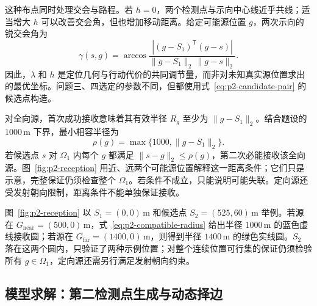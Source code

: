 这种布点同时处理交会与路程。若 \(h=0\)，两个检测点与示向中心线近乎共线；适当增大 \(h\) 可以改善交会角，但也增加移动距离。给定可能源位置 \(g\)，两次示向的锐交会角为
\begin{equation}
  \gamma(s,g)=\arccos\frac{\left|(g-S_1)^{\mathsf T}(g-s)\right|}
  {\|g-S_1\|_2\,\|g-s\|_2}.
  \label{eq:p2-crossing-angle}
\end{equation}
因此，\(\lambda\) 和 \(h\) 是定位几何与行动代价的共同调节量，而非对未知真实源位置求出的最优坐标。问题三、四选定的参数不同，但都使用式~\eqref{eq:p2-candidate-pair} 的候选点构造。

对全向源，首次成功接收意味着其有效半径 \(R_g\) 至少为 \(\|g-S_1\|_2\)。结合题设的 \(1000\,\mathrm{m}\) 下界，最小相容半径为
\begin{equation}
  \rho(g)=\max\{1000,\|g-S_1\|_2\}.
  \label{eq:p2-compatible-radius}
\end{equation}
若候选点 \(s\) 对 \(\Omega_1\) 内每个 \(g\) 都满足 \(\|s-g\|_2\le\rho(g)\)，第二次必能接收该全向源。图~\ref{fig:p2-reception} 用近、远两个可能源位置解释这一距离条件；它们只是示意，完整保证仍须检查整个 \(\Omega_1\)。若条件不成立，只能说明可能失联。定向源还受发射朝向限制，距离条件不能单独保证接收。


图~\ref{fig:p2-reception} 以 \(S_1=(0,0)\,\mathrm m\) 和候选点 \(S_2=(525,60)\,\mathrm m\) 举例。若源在 \(G_{\mathrm{near}}=(500,0)\,\mathrm m\)，式~\eqref{eq:p2-compatible-radius} 给出半径 \(1000\,\mathrm m\) 的蓝色虚线接收圆；若源在 \(G_{\mathrm{far}}=(1400,0)\,\mathrm m\)，则得到半径 \(1400\,\mathrm m\) 的绿色实线圆。\(S_2\) 落在这两个圆内，只验证了两种示例位置；对整个连续位置可行集的保证仍须检验所有 \(g\in\Omega_1\)，定向源还需另行满足发射朝向约束。

\subsection{模型求解：第二检测点生成与动态择边}

